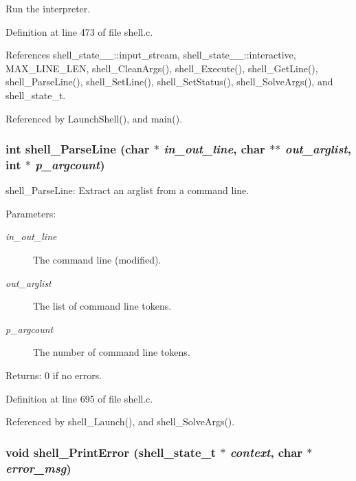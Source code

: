 Run the interpreter. 

Definition at line 473 of file shell.c.

References shell\_\-state\_\-\_\-::input\_\-stream, shell\_\-state\_\-\_\-::interactive, MAX\_\-LINE\_\-LEN, shell\_\-Clean\-Args(), shell\_\-Execute(), shell\_\-Get\-Line(), shell\_\-Parse\-Line(), shell\_\-Set\-Line(), shell\_\-Set\-Status(), shell\_\-Solve\-Args(), and shell\_\-state\_\-t.

Referenced by Launch\-Shell(), and main().
\subsubsection{\setlength{\rightskip}{0pt plus 5cm}int shell\_\-Parse\-Line (char $\ast$ {\em in\_\-out\_\-line}, char $\ast$$\ast$ {\em out\_\-arglist}, int $\ast$ {\em p\_\-argcount})}\label{shell_8c_a21}


shell\_\-Parse\-Line: Extract an arglist from a command line.

\begin{Desc}
\item[Parameters:]
\begin{description}
\item[{\em in\_\-out\_\-line}]The command line (modified). \item[{\em out\_\-arglist}]The list of command line tokens. \item[{\em p\_\-argcount}]The number of command line tokens.\end{description}
\end{Desc}
\begin{Desc}
\item[Returns:]0 if no errors. \end{Desc}


Definition at line 695 of file shell.c.

Referenced by shell\_\-Launch(), and shell\_\-Solve\-Args().
\subsubsection{\setlength{\rightskip}{0pt plus 5cm}void shell\_\-Print\-Error ({\bf shell\_\-state\_\-t} $\ast$ {\em context}, char $\ast$ {\em error\_\-msg})}\label{shell_8c_a27}


